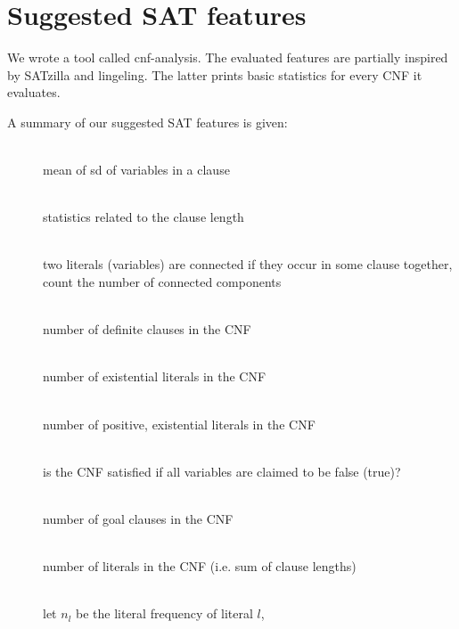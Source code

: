\section{Suggested SAT features}
\label{sec:features-suggested}
%
We wrote a tool called cnf-analysis. The evaluated features are partially inspired
by SATzilla and lingeling. The latter prints basic statistics for every CNF it
evaluates.

A summary of our suggested SAT features is given:

\begin{description}
\item[] \hfill{} \\
  mean of sd of variables in a clause
\item[] \hfill{} \\
  statistics related to the clause length
\item[] \hfill{} \\
  two literals (variables) are connected if they occur in some clause together,
  count the number of connected components
\item[] \hfill{} \\
  number of definite clauses in the CNF
\item[] \hfill{} \\
  number of existential literals in the CNF
\item[] \hfill{} \\
  number of positive, existential literals in the CNF
\item[] \hfill{} \\
  is the CNF satisfied if all variables are claimed to be false (true)?
\item[] \hfill{} \\
  number of goal clauses in the CNF
\item[] \hfill{} \\
  number of literals in the CNF (i.e. sum of clause lengths)
\item[] \hfill{} \\
  let $n_l$ be the literal frequency of literal $l$,

\end{description}
